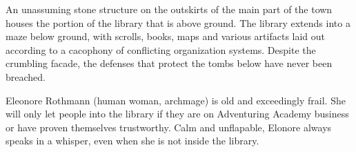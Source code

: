 An unassuming stone structure on the outskirts of the main part of the town houses the portion of the library that is above ground.
The library extends into a maze below ground, with scrolls, books, maps and various artifacts laid out according to a cacophony of conflicting organization systems.
Despite the crumbling facade, the defenses that protect the tombs below have never been breached.

Eleonore Rothmann (human woman, archmage) is old and exceedingly frail.
She will only let people into the library if they are on Adventuring Academy business or have proven themselves trustworthy.
Calm and unflapable, Elonore always speaks in a whisper, even when she is not inside the library.
